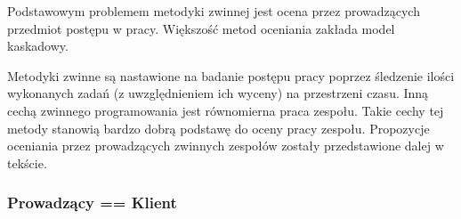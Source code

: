 Podstawowym problemem metodyki zwinnej jest ocena przez prowadzących przedmiot postępu w pracy. Większość metod oceniania zakłada model kaskadowy. 

Metodyki zwinne są nastawione na badanie postępu pracy poprzez śledzenie ilości wykonanych zadań (z uwzględnieniem ich wyceny) na przestrzeni czasu. Inną cechą zwinnego programowania jest równomierna praca zespołu. Takie cechy tej metody stanowią bardzo dobrą podstawę do oceny pracy zespołu. Propozycje oceniania przez prowadzących zwinnych zespołów zostały przedstawione dalej w tekście.

\subsubsection{Prowadzący == Klient}









